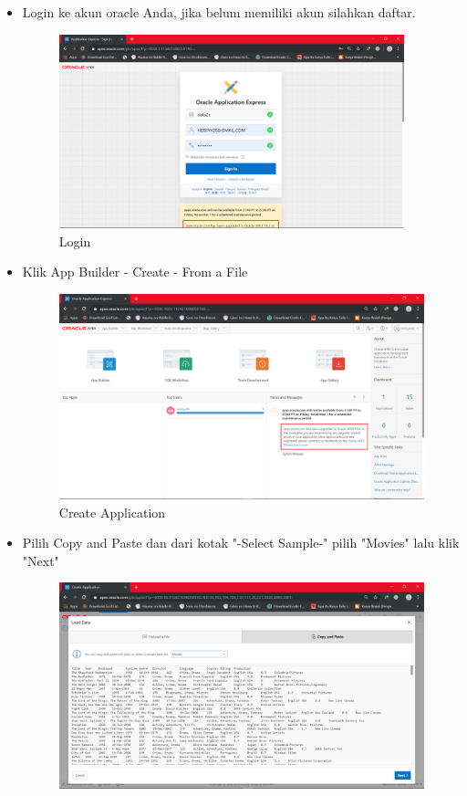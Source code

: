 \documentclass[12pt, times new roman]{article}
\begin{document}
\begin{itemize}
\item Login ke akun oracle Anda, jika belum memiliki akun silahkan daftar.
\begin{figure}[!htbp]
	\centering
	\includegraphics[width=10cm]{figures/Screenshot_1.png}
	\caption{Login}
\end{figure}
\item Klik App Builder - Create - From a File 
\begin{figure}[!htbp]
	\centering
	\includegraphics[width=12cm]{figures/Screenshot_2.png}
	\caption{Create Application}
\end{figure}
\item Pilih Copy and Paste dan dari kotak "-Select Sample-" pilih "Movies" lalu klik "Next"
\begin{figure}[!htpb]
	\centering
	\includegraphics[width=12cm]{figures/Screenshot_3.png}

\end{figure}
\end{itemize}
\end{document}
